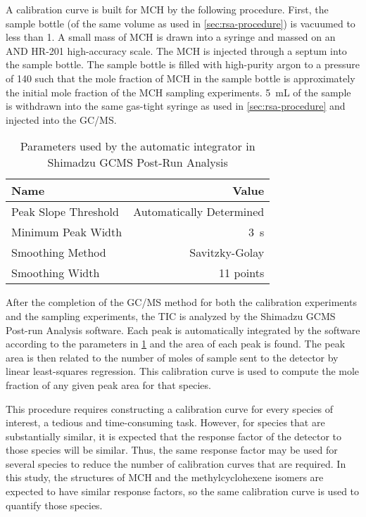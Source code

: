 \documentclass[../main.tex]{subfiles}
\begin{document}

A calibration curve is built for MCH by the following procedure. First,
the sample bottle (of the same volume as used in \cref{sec:rsa-procedure})
is vacuumed to less than \SI{1}{\torr}. A small mass of MCH is drawn
into a syringe and massed on an AND HR-201 high-accuracy scale. The MCH
is injected through a septum into the sample bottle. The sample bottle
is filled with high-purity argon to a pressure of \SI{140}{\torr} such
that the mole fraction of MCH in the sample bottle is approximately the
initial mole fraction of the MCH sampling experiments.
\SI{5}{\milli\liter} of the sample is withdrawn into the same gas-tight
syringe as used in \cref{sec:rsa-procedure} and injected into the GC/MS.

\begin{table}
\caption{Parameters used by the automatic integrator in Shimadzu GCMS Post-Run Analysis}
\label{tab:gcms-integrate}
\begin{tabular}{lr}
\toprule
Name & Value\\
\midrule
Peak Slope Threshold & Automatically Determined\\
Minimum Peak Width & \SI{3}{\second}\\
Smoothing Method & Savitzky-Golay\\
Smoothing Width & 11 points\\
\bottomrule
\end{tabular}
\end{table}

After the completion of the GC/MS method for both the calibration experiments
and the sampling experiments, the TIC is analyzed by the
Shimadzu GCMS Post-run Analysis software. Each peak is automatically
integrated by the software according to the parameters in
\cref{tab:gcms-integrate} and the area of each peak is found. The peak
area is then related to the number of moles of sample sent to the
detector by linear least-squares regression. This calibration curve is
used to compute the mole fraction of any given peak area for that species.

This procedure requires constructing a calibration curve for every species
of interest, a tedious and time-consuming task. However, for species that
are substantially similar, it is expected that the response factor of
the detector to those species will be similar. Thus, the same response
factor may be used for several species to reduce the number of calibration
curves that are required. In this study, the structures of MCH and the
methylcyclohexene isomers are expected to have similar response factors,
so the same calibration curve is used to quantify those species.
\end{document}
